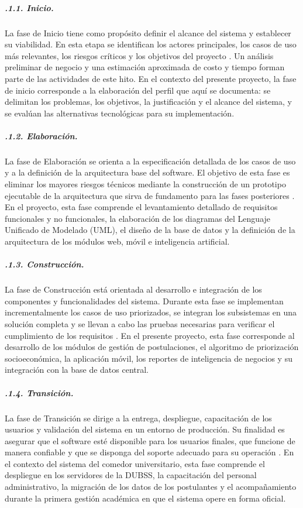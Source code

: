 \subparagraph{.1.1. Inicio.}\label{sec:puds_inicio}
La fase de Inicio tiene como propósito definir el alcance del sistema y establecer su viabilidad. En esta etapa se identifican los actores principales, los casos de uso más relevantes, los riesgos críticos y los objetivos del proyecto \parencite[p.~214]{jacobson1999unified}. Un análisis preliminar de negocio y una estimación aproximada de costo y tiempo forman parte de las actividades de este hito. En el contexto del presente proyecto, la fase de inicio corresponde a la elaboración del perfil que aquí se documenta: se delimitan los problemas, los objetivos, la justificación y el alcance del sistema, y se evalúan las alternativas tecnológicas para su implementación.

\subparagraph{.1.2. Elaboración.}\label{sec:puds_elaboracion}
La fase de Elaboración se orienta a la especificación detallada de los casos de uso y a la definición de la arquitectura base del software. El objetivo de esta fase es eliminar los mayores riesgos técnicos mediante la construcción de un prototipo ejecutable de la arquitectura que sirva de fundamento para las fases posteriores \parencite[p.~248]{jacobson1999unified}. En el proyecto, esta fase comprende el levantamiento detallado de requisitos funcionales y no funcionales, la elaboración de los diagramas del Lenguaje Unificado de Modelado (UML), el diseño de la base de datos y la definición de la arquitectura de los módulos web, móvil e inteligencia artificial.

\subparagraph{.1.3. Construcción.}\label{sec:puds_construccion}
La fase de Construcción está orientada al desarrollo e integración de los componentes y funcionalidades del sistema. Durante esta fase se implementan incrementalmente los casos de uso priorizados, se integran los subsistemas en una solución completa y se llevan a cabo las pruebas necesarias para verificar el cumplimiento de los requisitos \parencite[p.~332]{jacobson1999unified}. En el presente proyecto, esta fase corresponde al desarrollo de los módulos de gestión de postulaciones, el algoritmo de priorización socioeconómica, la aplicación móvil, los reportes de inteligencia de negocios y su integración con la base de datos central.

\subparagraph{.1.4. Transición.}\label{sec:puds_transicion}
La fase de Transición se dirige a la entrega, despliegue, capacitación de los usuarios y validación del sistema en un entorno de producción. Su finalidad es asegurar que el software esté disponible para los usuarios finales, que funcione de manera confiable y que se disponga del soporte adecuado para su operación \parencite[p.~379]{jacobson1999unified}. En el contexto del sistema del comedor universitario, esta fase comprende el despliegue en los servidores de la DUBSS, la capacitación del personal administrativo, la migración de los datos de los postulantes y el acompañamiento durante la primera gestión académica en que el sistema opere en forma oficial.


